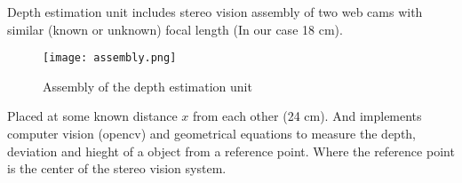 \documentclass[../block_diagram_intro/block_diagram_intro.tex]{subfiles}
\begin{document}
    
Depth estimation unit includes stereo vision assembly of two web cams with similar 
(known or unknown) focal length (In our case 18 cm).

\begin{figure}[h]
    \texttt{[image: assembly.png]}
    \caption{Assembly of the depth estimation unit}
\end{figure}

Placed at some known distance \(x \) from each other (24 cm). And implements
computer vision (opencv) and geometrical equations to measure the depth, deviation 
and hieght of a object from a reference point. Where the reference point is the 
center of the stereo vision system. 
\end{document}
